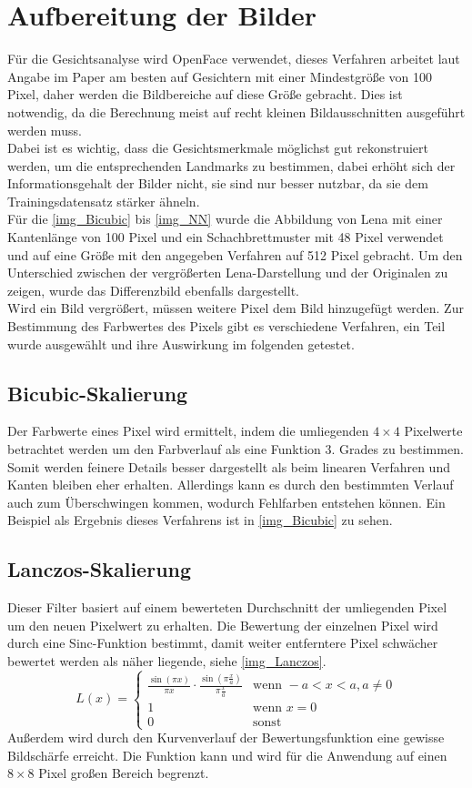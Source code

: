 \section{Aufbereitung der Bilder}
\label{scale_Algos}
Für die Gesichtsanalyse wird OpenFace verwendet, dieses Verfahren arbeitet laut Angabe im Paper \cite{OpenFace} am besten auf Gesichtern mit einer Mindestgröße von 100 Pixel, daher werden die Bildbereiche auf diese Größe gebracht. Dies ist notwendig, da die Berechnung meist auf recht kleinen Bildausschnitten ausgeführt werden muss.\\
Dabei ist es wichtig, dass die Gesichtsmerkmale möglichst gut rekonstruiert werden, um die entsprechenden Landmarks zu bestimmen, dabei erhöht sich der Informationsgehalt der Bilder nicht, sie sind nur besser nutzbar, da sie dem Trainingsdatensatz stärker ähneln.\\
Für die \autoref{img_Bicubic} bis \ref{img_NN} wurde die Abbildung von Lena mit einer Kantenlänge von 100 Pixel und ein Schachbrettmuster mit 48 Pixel verwendet und auf eine Größe mit den angegeben Verfahren auf 512 Pixel gebracht. Um den Unterschied zwischen der vergrößerten Lena-Darstellung und der Originalen zu zeigen, wurde das Differenzbild ebenfalls dargestellt.\\
Wird ein Bild vergrößert, müssen weitere Pixel dem Bild hinzugefügt werden. Zur Bestimmung des Farbwertes des Pixels gibt es verschiedene Verfahren, ein Teil wurde ausgewählt und ihre Auswirkung im folgenden getestet.
\subsection{Bicubic-Skalierung}
Der Farbwerte eines Pixel wird ermittelt, indem die umliegenden $4\times 4$ Pixelwerte betrachtet werden um den Farbverlauf als eine Funktion 3. Grades zu bestimmen. Somit werden feinere Details besser dargestellt als beim linearen Verfahren und Kanten bleiben eher erhalten. Allerdings kann es durch den bestimmten Verlauf auch zum Überschwingen kommen, wodurch Fehlfarben entstehen können. Ein Beispiel als Ergebnis dieses Verfahrens ist in \autoref{img_Bicubic} zu sehen. \cite{wiki_Bicubic}
\subsection{Lanczos-Skalierung}
Dieser Filter basiert auf einem bewerteten Durchschnitt der umliegenden Pixel um den neuen Pixelwert zu erhalten. Die Bewertung der einzelnen Pixel wird durch eine Sinc-Funktion bestimmt, damit weiter entferntere Pixel schwächer bewertet werden als näher liegende, siehe \autoref{img_Lanczos}.
\[ L(x)= \left\{ \begin{array}{ll}
\frac{\sin(\pi x)}{\pi x} \cdot \frac{\sin(\pi \frac{x}{a})}{\pi \frac{x}{a}} & \textrm{wenn } -a < x <a, a\ne 0\\
1 & \textrm{wenn } x = 0\\
0 & \textrm{sonst}
\end{array}\right. \]
Außerdem wird durch den Kurvenverlauf der Bewertungsfunktion eine gewisse Bildschärfe erreicht. Die Funktion kann und wird für die Anwendung auf einen $8\times 8$ Pixel großen Bereich begrenzt. \cite{wiki_Lanczos}
